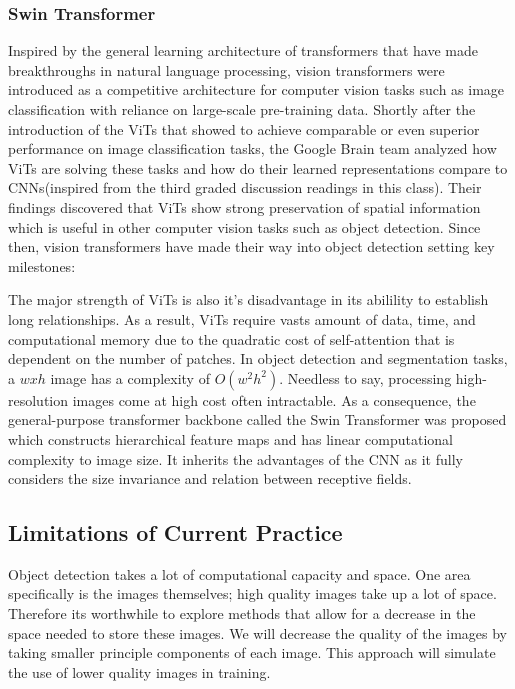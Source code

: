 \documentclass[10pt,twocolumn,letterpaper]{article}
\begin{document}
\vspace{-4.5mm}

\subsubsection{Swin Transformer}

Inspired by the general learning architecture of transformers\cite{vaswani2017attention} that have made breakthroughs in natural language processing, vision transformers were introduced as a competitive architecture for computer vision tasks such as image classification\cite{dosovitskiy2020image} with reliance on large-scale pre-training data. Shortly after the introduction of the ViTs that showed to achieve comparable or even superior performance on image classification tasks, the Google Brain team analyzed how ViTs are solving these tasks and how do their learned representations compare to CNNs\cite{raghu2021vision}(inspired from the third graded discussion readings in this class). Their findings discovered that ViTs show strong preservation of spatial information which is useful in other computer vision tasks such as object detection. Since then, vision transformers have made their way into object detection setting key milestones\cite{arkin2021survey}:


The major strength of ViTs is also it's disadvantage in its abilility to establish long relationships. As a result, ViTs require vasts amount of data, time, and computational memory due to the quadratic cost of self-attention that is dependent on the number of patches. In object detection and segmentation tasks, a $wxh$ image has a complexity of $O(w^2h^2)$. Needless to say, processing high-resolution images come at high cost often intractable. As a consequence, the general-purpose transformer backbone called the Swin Transformer\cite{liu2021swin} was proposed which constructs hierarchical feature maps and has linear computational complexity to image size. It inherits the advantages of the CNN as it fully considers the size invariance and relation between receptive fields.

\subsection{Limitations of Current Practice}

Object detection takes a lot of computational capacity and space. One area specifically is the images themselves; high quality images take up a lot of space. Therefore its worthwhile to explore methods that allow for a decrease in the space needed to store these images. We will decrease the quality of the images by taking smaller principle components of each image. This approach will simulate the use of lower quality images in training. 
\end{document}
